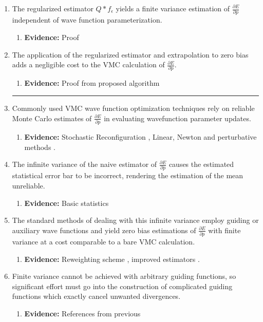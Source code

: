 \documentclass{article}
\begin{document}
\begin{enumerate}
\item The regularized estimator $Q * f_\epsilon$ yields a finite variance estimation of $\frac{\partial E}{\partial p}$ independent of wave function parameterization.
\begin{enumerate}
\item \textbf{Evidence:} Proof
\end{enumerate}

\item The application of the regularized estimator and extrapolation to zero bias adds a negligible cost to the VMC calculation of $\frac{\partial E}{\partial p}$.
\begin{enumerate}
\item \textbf{Evidence:} Proof from proposed algorithm
\end{enumerate}

\noindent\rule{\textwidth}{1pt}
\item Commonly used VMC wave function optimization techniques rely on reliable Monte Carlo estimates of $\frac{\partial E}{\partial p}$ in evaluating wavefunction parameter updates.
\begin{enumerate}
\item \textbf{Evidence:} Stochastic Reconfiguration \cite{PhysRevB.64.024512, doi:10.1063/1.1604379}, Linear, Newton and perturbative methods \cite{Toulouse2007}.
\end{enumerate}

\item The infinite variance of the naive estimator of $\frac{\partial E}{\partial p}$ causes the estimated statistical error bar to be incorrect, rendering the estimation of the mean unreliable.
\begin{enumerate}
\item \textbf{Evidence:} Basic statistics
\end{enumerate}

\item The standard methods of dealing with this infinite variance employ guiding or auxiliary wave functions and yield zero bias estimations of $\frac{\partial E}{\partial p}$ with finite variance at a cost comparable to a bare VMC calculation.
\begin{enumerate}
\item \textbf{Evidence:} Reweighting scheme \cite{Attaccalite2008, Avella}, improved estimators \cite{doi:10.1063/1.1286598, Assaraf2003}.
\end{enumerate}

\item Finite variance cannot be achieved with arbitrary guiding functions, so significant effort must go into the construction of complicated guiding functions which exactly cancel unwanted divergences.
\begin{enumerate}
\item \textbf{Evidence:} References from previous
\end{enumerate}

\end{enumerate}


\end{document}

